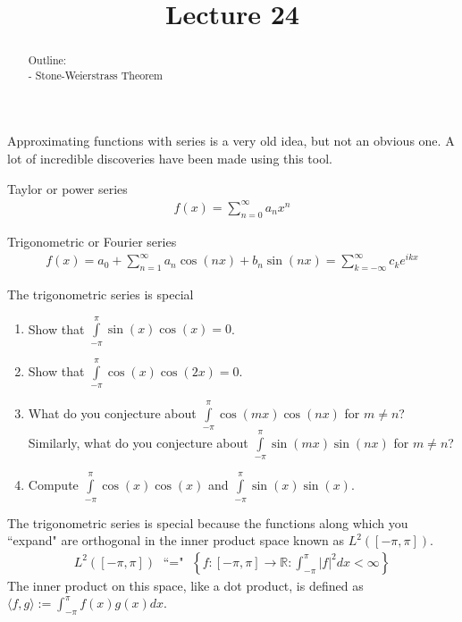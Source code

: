 \documentclass{ximera}
\begin{document}
    \title{Lecture 24}
    
    \begin{abstract}  
    Outline: \\
    - Stone-Weierstrass Theorem
\end{abstract}

\maketitle


Approximating functions with series is a very old idea, but not an obvious one.  A lot of incredible discoveries have been made using this tool.

Taylor or power series
\begin{align*}
    f(x) = \sum\limits_{n=0}^\infty a_nx^n
\end{align*}

Trigonometric or Fourier series
\begin{align*}
    f(x) = a_0 + \sum\limits_{n=1}^\infty a_n \cos(nx) + b_n \sin(nx) = \sum\limits_{k=-\infty}^\infty c_k e^{ikx}
\end{align*}

The trigonometric series is special

\begin{exercise}
    \begin{enumerate}
        \item Show that $\int\limits_{-\pi}^\pi \sin(x)\cos(x) = 0$.
        \item Show that $\int\limits_{-\pi}^\pi \cos(x)\cos(2x) = 0$.
        \item What do you conjecture about $\int\limits_{-\pi}^\pi \cos(mx)\cos(nx)$ for $m \neq n$?  Similarly,  what do you conjecture about $\int\limits_{-\pi}^\pi \sin(mx)\sin(nx)$ for $m \neq n$?
        \item Compute $\int\limits_{-\pi}^\pi \cos(x)\cos(x)$ and $\int\limits_{-\pi}^\pi \sin(x)\sin(x)$.
    \end{enumerate}
\end{exercise}

The trigonometric series is special because the functions along which you ``expand" are orthogonal in the inner product space known as $L^2([-\pi,\pi])$.
\begin{align*}
    L^2([-\pi,\pi]) \; \text{ ``=" } \; \left\{f:[-\pi,\pi] \to \mathbb{R}
: \int_{-\pi}^\pi |f|^2 dx < \infty \right\}
\end{align*}
The inner product on this space, like a dot product, is defined as $\langle f,g\rangle := \int_{-\pi}^\pi f(x) g(x) dx$.
\end{document}
